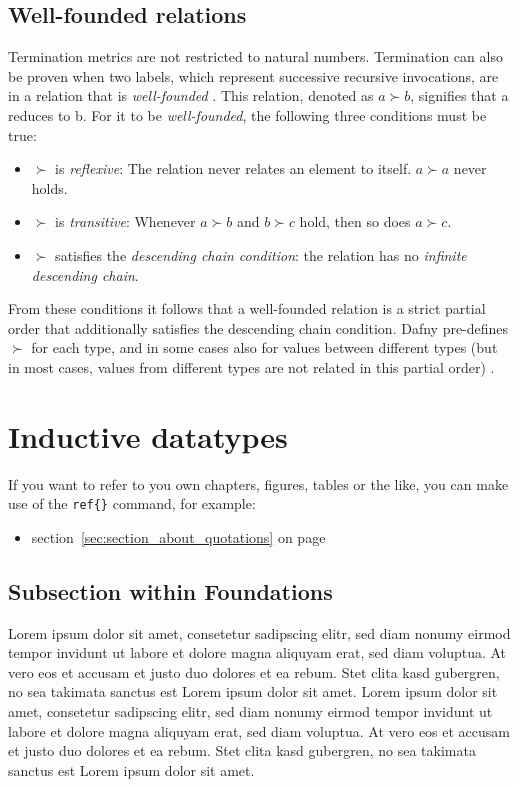 \documentclass[a4paper]{article}
\begin{document}
\subsection{Well-founded relations}
Termination metrics are not restricted to natural numbers.
Termination can also be proven when two labels, which represent successive recursive invocations, are in a relation
that is \textit{well-founded} \cite{leino2023program}. This relation, denoted as $a \succ b$, signifies that a
reduces to b. For it to be \textit{well-founded}, the following three conditions must be true:
\begin{itemize}
	\item $ \succ $ is \textit{reflexive}: The relation never relates an element to itself. $a \succ a$ never holds.
	\item $ \succ $ is \textit{transitive}: Whenever $a \succ b$ and $b \succ c$ hold, then so does $a \succ c$.
	\item $ \succ $ satisfies the \textit{descending chain condition}: the relation has no \textit{infinite descending chain}.
\end{itemize}
From these conditions it follows that a well-founded relation is a strict partial order that additionally
satisfies the descending chain condition. Dafny pre-defines $ \succ $ for each type, and in some cases also
for values between different types (but in most cases, values from different types are not related in
this partial order) \cite{leino2023program}.

\section{Inductive datatypes}
\label{sec:section_about_references_within_the_document}

If you want to refer to you own chapters, figures, tables or the like, you can make use of the \texttt{ref\{\}} command, for example:
\begin{itemize}
	\item section~\ref{sec:section_about_quotations} on page \pageref{sec:section_about_quotations}
\end{itemize}




\subsection{Subsection within Foundations} %
\label{sub:subsection_within_foundations}
Lorem ipsum dolor sit amet, consetetur sadipscing elitr, sed diam nonumy eirmod tempor invidunt ut labore et dolore magna aliquyam erat, sed diam voluptua. At vero eos et accusam et justo duo dolores et ea rebum. Stet clita kasd gubergren, no sea takimata sanctus est Lorem ipsum dolor sit amet. Lorem ipsum dolor sit amet, consetetur sadipscing elitr, sed diam nonumy eirmod tempor invidunt ut labore et dolore magna aliquyam erat, sed diam voluptua. At vero eos et accusam et justo duo dolores et ea rebum. Stet clita kasd gubergren, no sea takimata sanctus est Lorem ipsum dolor sit amet.
\end{document}
